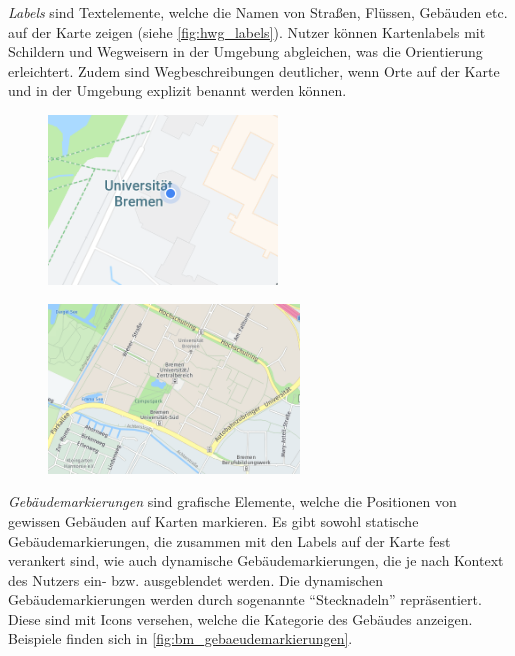 \emph{Labels} sind Textelemente, welche die Namen von Straßen, Flüssen, Gebäuden etc. auf der Karte zeigen (siehe \autoref{fig:hwg_labels}).
Nutzer können Kartenlabels mit Schildern und Wegweisern in der Umgebung abgleichen, was die Orientierung erleichtert.
Zudem sind Wegbeschreibungen deutlicher, wenn Orte auf der Karte und in der Umgebung explizit benannt werden können.
\begin{figure}[h]
    \centering
    \begin{minipage}[t]{.485\textwidth}
        \centering
        \vspace{0pt}
        \includegraphics[width=\linewidth, height=4.5cm]{figures/map-app_examples/gm_positionsmarker}
        \label{fig:gm_positionsmarker}
        \vfill
    \end{minipage}
    \hfill
    \begin{minipage}[t]{.485\textwidth}
        \centering
        \vspace{0pt}
        \includegraphics[width=\linewidth, height=4.5cm]{figures/map-app_examples/hwg_labels}
        \label{fig:hwg_labels}
    \end{minipage}
\end{figure}

\emph{Gebäudemarkierungen} sind grafische Elemente, welche die Positionen von gewissen Gebäuden auf Karten markieren.
Es gibt sowohl statische Gebäudemarkierungen, die zusammen mit den Labels auf der Karte fest verankert sind, wie auch dynamische Gebäudemarkierungen, die je nach Kontext des Nutzers ein- bzw. ausgeblendet werden.
Die dynamischen Gebäudemarkierungen werden durch sogenannte \enquote{Stecknadeln} repräsentiert.
Diese sind mit Icons versehen, welche die Kategorie des Gebäudes anzeigen.
Beispiele finden sich in \autoref{fig:bm_gebaeudemarkierungen}.

